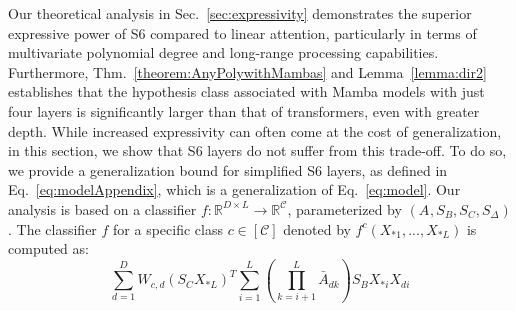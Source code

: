 Our theoretical analysis in Sec.~\ref{sec:expressivity} demonstrates the superior expressive power of S6 compared to linear attention, particularly in terms of multivariate polynomial degree and long-range processing capabilities. Furthermore, Thm.~\ref{theorem:AnyPolywithMambas} and Lemma~\ref{lemma:dir2} establishes that the hypothesis class associated with Mamba models with just four layers is significantly larger than that of transformers, even with greater depth. While increased expressivity can often come at the cost of generalization, in this section, we show that S6 layers do not suffer from this trade-off. To do so, we %
provide a generalization bound for simplified S6 layers, as {\color{black}defined in Eq.~\ref{eq:modelAppendix}, which is a generalization of Eq.~\ref{eq:model}}. Our analysis is based on a classifier \( f : \mathbb{R}^{D \times L} \rightarrow \mathbb{R}^{\mathcal{C}} \), parameterized by  \( (A^{}, S_B^{}, S_C^{}, S_{\Delta}^{}) \).
The classifier \( f \) for a specific class \( c \in [\mathcal{C}] \) denoted by $f^c(X_{*1},...,X_{*L})$ is computed as:
%
\vspace{-3pt}
{\small
\begin{equation}
\sum_{d=1}^D W_{c,d} \left(S_C^{} X^{}_{*L}\right)^T \sum_{i=1}^L \left(\prod_{k=i+1}^L \bar{A}^{}_{dk} \right) S_B^{} X^{}_{*i} X^{}_{di}
\end{equation}
}
